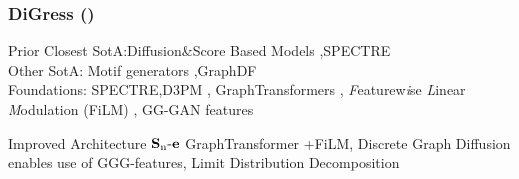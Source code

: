 \documentclass[./presentation.tex]{subfiles}
\begin{document}
\begin{frame}[t,label=digressfin]
  \frametitle{DiGress (\cite{vignacDiGressDiscreteDenoising2023b})}
  \vspace{-1cm}
\footnotesize
\begin{priorart}
{\footnotesize
    Prior Closest SotA:Diffusion\&Score Based Models \citep{niuPermutationInvariantGraph2020b,songGenerativeModelingEstimating2019b},SPECTRE \citep{martinkusSPECTRESpectralConditioning2022b}\\
    Other SotA: Motif generators \citep{maziarzLearningExtendMolecular2021},GraphDF\citep{luoGraphDFDiscreteFlow2021d}
\\
Foundations: SPECTRE,D3PM \citep{austinStructuredDenoisingDiffusion2021e}, GraphTransformers \citep{vaswaniAttentionAllYou2017c,yunGraphTransformerNetworks2019b}, \textit{F}eaturew\textit{i}se \textit{L}inear \textit{M}odulation (FiLM) \citep{perezFiLMVisualReasoning2018b}, GG-GAN features
 }
  \end{priorart}
  \vspace{-0.25cm}
  \begin{contributions}
    Improved Architecture $\operatorname{\mathbf{S}_n\mathbf{-e}}$ GraphTransformer +FiLM, Discrete Graph Diffusion enables use of GGG-features, Limit Distribution Decomposition
  \end{contributions}
  \vspace{-0.25cm}
  \begin{columns}
        \footnotesize
    \begin{column}{0.5\textwidth}
    \end{column}
    \begin{column}{0.5\textwidth}
    \end{column}
  \end{columns}
\end{frame}
\end{document}
